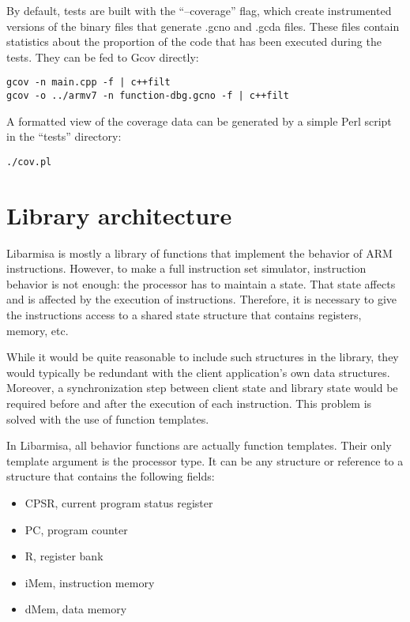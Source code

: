 \documentclass[letterpaper,12pt]{article}
\begin{document}
By default, tests are built with the ``--coverage'' flag, which create
instrumented versions of the binary files that generate .gcno and
.gcda files. These files contain statistics about the proportion of
the code that has been executed during the tests. They can be fed to
Gcov directly:
\begin{verbatim}
gcov -n main.cpp -f | c++filt
gcov -o ../armv7 -n function-dbg.gcno -f | c++filt
\end{verbatim}

A formatted view of the coverage data can be generated by a simple
Perl script in the ``tests'' directory:
\begin{verbatim}
./cov.pl
\end{verbatim}


\section{Library architecture}
\label{sec:arch}

Libarmisa is mostly a library of functions that implement the behavior
of ARM instructions. However, to make a full instruction set
simulator, instruction behavior is not enough: the processor has to
maintain a state. That state affects and is affected by the execution
of instructions. Therefore, it is necessary to give the instructions
access to a shared state structure that contains registers, memory,
etc.

While it would be quite reasonable to include such structures in the
library, they would typically be redundant with the client
application's own data structures. Moreover, a synchronization step
between client state and library state would be required before and
after the execution of each instruction. This problem is solved with
the use of function templates.

In Libarmisa, all behavior functions are actually function
templates. Their only template argument is the processor type. It can
be any structure or reference to a structure that contains the
following fields:
\begin{itemize}
\item CPSR, current program status register
\item PC, program counter
\item R, register bank
\item iMem, instruction memory
\item dMem, data memory
\end{itemize}
\end{document}
